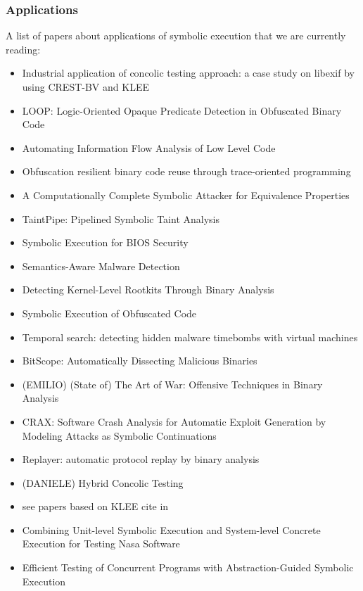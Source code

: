 \documentclass[10pt, a4paper]{article}
\begin{document}
\subsubsection{Applications}
A list of papers about applications of symbolic execution that we are currently reading:
\begin{itemize}
  \item \cite{KKK-ICSE12} Industrial application of concolic testing approach: a case study on libexif by using CREST-BV and KLEE
  \item \cite{LOOP-CCS15} LOOP: Logic-Oriented Opaque Predicate Detection in Obfuscated Binary Code
  \item \cite{BDG-CCS14} Automating Information Flow Analysis of Low Level Code
  \item \cite{ZFM-CCS13} Obfuscation resilient binary code reuse through trace-oriented programming
  \item \cite{BC-CCS14} A Computationally Complete Symbolic Attacker for Equivalence Properties
  \item \cite{MWX-USEC15} TaintPipe: Pipelined Symbolic Taint Analysis
  \item \cite{BLR-WOOT15} Symbolic Execution for {BIOS} Security
  \item \cite{CJS-SP05} Semantics-Aware Malware Detection
  \item \cite{KRV-ACSAC04} Detecting Kernel-Level Rootkits Through Binary Analysis
  \item \cite{YD-CCS15} Symbolic Execution of Obfuscated Code
  \item \cite{CWO-ASPLOS06} Temporal search: detecting hidden malware timebombs with virtual machines
  \item \cite{BHK-TR07} BitScope: Automatically Dissecting Malicious Binaries
  \item (EMILIO) \cite{ANGR-SP16} (State of) The Art of War: Offensive Techniques in Binary Analysis
  \item \cite{CRAX-SERE12} CRAX: Software Crash Analysis for Automatic Exploit Generation by Modeling Attacks as Symbolic Continuations
  \item \cite{REPLAYER-CCS06} Replayer: automatic protocol replay by binary analysis
  \item (DANIELE) \cite{RK-ICSE07} Hybrid Concolic Testing
  \item see papers based on KLEE cite in~\cite{RED-ICSE16} 
  \item \cite{PMB-ISSTA08} Combining Unit-level Symbolic Execution and System-level Concrete Execution for Testing Nasa Software
  \item \cite{RMV-SPIN09} Efficient Testing of Concurrent Programs with Abstraction-Guided Symbolic Execution
  \end{itemize}


\end{document}
